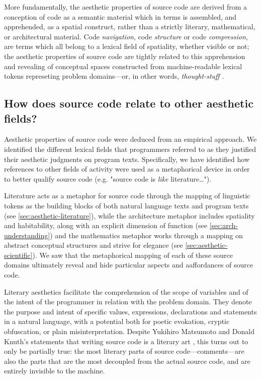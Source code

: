 More fundamentally, the aesthetic properties of source code are derived from a conception of code as a semantic material which in terms is assembled, and apprehended, as a spatial construct, rather than a strictly literary, mathematical, or architectural material. Code \emph{navigation}, code \emph{structure} or code \emph{compression}, are terms which all belong to a lexical field of spatiality, whether visible or not; the aesthetic properties of source code are tightly related to this apprehension and revealing of conceptual spaces constructed from machine-readable lexical tokens represeting problem domains—or, in other words, \emph{thought-stuff} \citep{brooksjr_mythical_1975}.

\subsection*{How does source code relate to other aesthetic fields?}
\label{subsec:conclusion-rq-2}

Aesthetic properties of source code were deduced from an empirical approach. We identified the different lexical fields that programmers referred to as they justified their aesthetic judgments on program texts. Specifically, we have identified how references to other fields of activity were used as a metaphorical device in order to better qualify source code (e.g. "source code is \emph{like} literature\dots").

Literature acts as a metaphor for source code through the mapping of linguistic tokens as the building blocks of both natural language texts and program texts (see \autoref{sec:aesthetic-literature}), while the architecture metaphor includes spatiality and habitability, along with an explicit dimension of function (see \autoref{sec:arch-understanding}) and the mathematics metaphor works through a mapping on abstract conceptual structures and strive for elegance (see \autoref{sec:aesthetic-scientific}). We saw that the metaphorical mapping of each of these source domains ultimately reveal and hide particular aspects and aaffordances of source code.

Literary aesthetics facilitate the comprehension of the scope of variables and of the intent of the programmer in relation with the problem domain. They denote the purpose and intent of specific values, expressions, declarations and statements in a natural language, with a potential both for poetic evokation, cryptic obfuscation, or plain misinterpretation. Despite Yukihiro Matsumoto and Donald Knuth's statements that writing source code is a literary art \citep{knuth_literate_1984,matsumoto_treating_2007}, this turns out to only be partially true: the most literary parts of source code—comments—are also the parts that are the most decoupled from the actual source code, and are entirely invisible to the machine.

